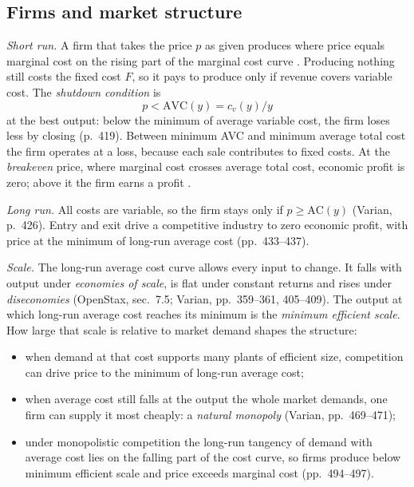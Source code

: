 \subsection{Firms and market structure}

\begin{qfmethod}\label{meth:cost-output-shutdown}
 \emph{Short run.} A firm that takes the price $p$ as given produces where price equals marginal cost on the rising part of the marginal cost curve \citep[pp.~416--418]{varian-microeconomics-2014}. Producing nothing still costs the fixed cost $F$, so it pays to produce only if revenue covers variable cost. The \emph{shutdown condition} is
\[ p<\mathrm{AVC}(y)=c_v(y)/y \]
at the best output: below the minimum of average variable cost, the firm loses less by closing (p.~419). Between minimum AVC and minimum average total cost the firm operates at a loss, because each sale contributes to fixed costs. At the \emph{breakeven} price, where marginal cost crosses average total cost, economic profit is zero; above it the firm earns a profit \citep[sec.~8.2]{openstax-microeconomics-3e}.

\emph{Long run.} All costs are variable, so the firm stays only if $p\geq\mathrm{AC}(y)$ (Varian, p.~426). Entry and exit drive a competitive industry to zero economic profit, with price at the minimum of long-run average cost (pp.~433--437).

\emph{Scale.} The long-run average cost curve allows every input to change. It falls with output under \emph{economies of scale}, is flat under constant returns and rises under \emph{diseconomies} (OpenStax, sec.~7.5; Varian, pp.~359--361, 405--409). The output at which long-run average cost reaches its minimum is the \emph{minimum efficient scale}. How large that scale is relative to market demand shapes the structure:
\begin{itemize}
\item when demand at that cost supports many plants of efficient size, competition can drive price to the minimum of long-run average cost;
\item when average cost still falls at the output the whole market demands, one firm can supply it most cheaply: a \emph{natural monopoly} (Varian, pp.~469--471);
\item under monopolistic competition the long-run tangency of demand with average cost lies on the falling part of the cost curve, so firms produce below minimum efficient scale and price exceeds marginal cost (pp.~494--497).
\end{itemize}


\end{qfmethod}
